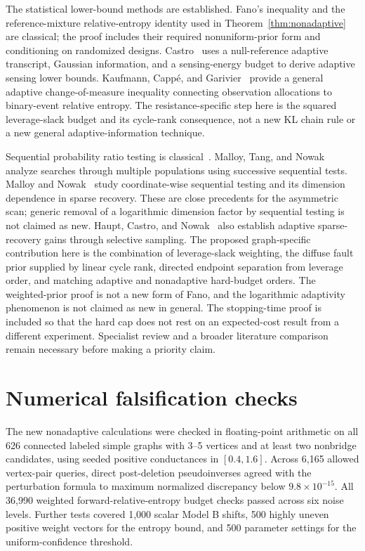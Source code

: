 \documentclass[11pt,letterpaper]{article}
\begin{document}
The statistical lower-bound methods are established. Fano's inequality and the reference-mixture relative-entropy identity used in Theorem~\ref{thm:nonadaptive} are classical; the proof includes their required nonuniform-prior form and conditioning on randomized designs. Castro~\cite{Castro} uses a null-reference adaptive transcript, Gaussian information, and a sensing-energy budget to derive adaptive sensing lower bounds. Kaufmann, Capp\'e, and Garivier~\cite{KCG} provide a general adaptive change-of-measure inequality connecting observation allocations to binary-event relative entropy. The resistance-specific step here is the squared leverage-slack budget and its cycle-rank consequence, not a new KL chain rule or a new general adaptive-information technique.

Sequential probability ratio testing is classical~\cite{Wald}. Malloy, Tang, and Nowak~\cite{MTN} analyze searches through multiple populations using successive sequential tests. Malloy and Nowak~\cite{MN} study coordinate-wise sequential testing and its dimension dependence in sparse recovery. These are close precedents for the asymmetric scan; generic removal of a logarithmic dimension factor by sequential testing is not claimed as new. Haupt, Castro, and Nowak~\cite{HCN} also establish adaptive sparse-recovery gains through selective sampling. The proposed graph-specific contribution here is the combination of leverage-slack weighting, the diffuse fault prior supplied by linear cycle rank, directed endpoint separation from leverage order, and matching adaptive and nonadaptive hard-budget orders. The weighted-prior proof is not a new form of Fano, and the logarithmic adaptivity phenomenon is not claimed as new in general. The stopping-time proof is included so that the hard cap does not rest on an expected-cost result from a different experiment. Specialist review and a broader literature comparison remain necessary before making a priority claim.

\section{Numerical falsification checks}
The new nonadaptive calculations were checked in floating-point arithmetic on all 626 connected labeled simple graphs with 3--5 vertices and at least two nonbridge candidates, using seeded positive conductances in $[0.4,1.6]$. Across 6,165 allowed vertex-pair queries, direct post-deletion pseudoinverses agreed with the perturbation formula to maximum normalized discrepancy below $9.8\times10^{-15}$. All 36,990 weighted forward-relative-entropy budget checks passed across six noise levels. Further tests covered 1,000 scalar Model B shifts, 500 highly uneven positive weight vectors for the entropy bound, and 500 parameter settings for the uniform-confidence threshold.
\end{document}
